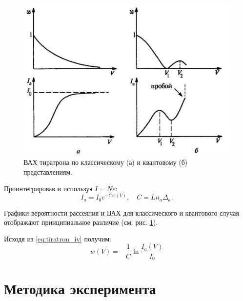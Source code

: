\documentclass[12pt,a4paper]{article}
\newcommand{\figref}[1]{(см. рис. \ref{#1})}
\begin{document}
	\begin{figure}
		\includegraphics[scale=0.4]{res/tiratron_iv.png}
		\caption{ВАХ тиратрона по классическому (а) и квантовому (б) представлениям.}
		\label{fig:tiratron_iv}
		\vspace{0pt}
	\end{figure}
	
	Проинтегрировав и используя $I = Ne$:
	\begin{equation}
		I_a = I_0 e^{-C w(V)}, \quad C = L n_a \Delta_a.
		\label{eq:tiratron_iv}
	\end{equation}
	
	Графики вероятности рассеяния и ВАХ для классического и квантового случая отображают принципиальное различие \figref{fig:tiratron_iv}.
	
	Исходя из \eqref{eq:tiratron_iv} получим:
	\begin{equation}
		w(V) = -\frac{1}{C} \ln \frac{I_a(V)}{I_0}
		\label{eq:probability}
	\end{equation}
		
	\newpage
	\section*{Методика эксперимента}
	
\end{document}
